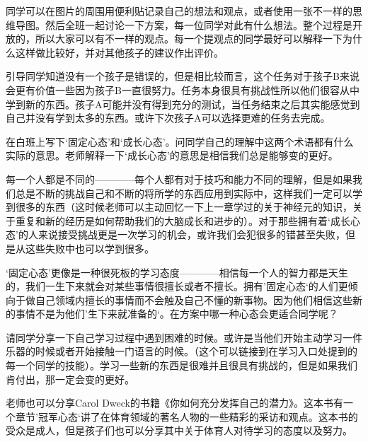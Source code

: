     同学可以在图片的周围用便利贴记录自己的想法和观点，或者使用一张不一样的思维导图。然后全班一起讨论一下方案，每一位同学对此有什么想法。整个过程是开放的，所以大家可以有不一样的观点。每一个提观点的同学最好可以解释一下为什么这样做比较好，并对其他孩子的建议作出评价。\par
    引导同学知道没有一个孩子是错误的，但是相比较而言，这个任务对于孩子B来说会更有价值一些因为孩子B一直很努力。任务本身很具有挑战性所以他们很容从中学到新的东西。孩子A可能并没有得到充分的测试，当任务结束之后其实能感觉到自己并没有学到太多的东西。或许下次孩子A可以选择更难的任务去完成。\par
    在白班上写下‘固定心态’和‘成长心态’。问同学自己的理解中这两个术语都有什么实际的意思。老师解释一下‘成长心态’的意思是相信我们总是能够变的更好。\par
    每一个人都是不同的————每个人都有对于技巧和能力不同的理解，但是如果我们总是不断的挑战自己和不断的将所学的东西应用到实际中，这样我们一定可以学到很多的东西（这时候老师可以主动回忆一下上一章学过的关于神经元的知识，关于重复和新的经历是如何帮助我们的大脑成长和进步的）。对于那些拥有着‘成长心态’的人来说接受挑战更是一次学习的机会，或许我们会犯很多的错甚至失败，但是从这些失败中也可以学到很多。\par
    ‘固定心态'更像是一种很死板的学习态度————相信每一个人的智力都是天生的，我们一生下来就会对某些事情很擅长或者不擅长。拥有’固定心态‘的人们更倾向于做自己领域内擅长的事情而不会触及自己不懂的新事物。因为他们相信这些新的事情不是为他们’生下来就准备的‘。在方案中哪一种心态会更适合同学呢？\par
    请同学分享一下自己学习过程中遇到困难的时候。或许是当他们开始主动学习一件乐器的时候或者开始接触一门语言的时候。（这个可以链接到在学习入口处提到的每一个同学的技能）。学习一些新的东西是很难并且很具有挑战的，但是如果我们肯付出，那一定会变的更好。\par
    老师也可以分享Carol Dweck的书籍《你如何充分发挥自己的潜力》。这本书有一个章节’冠军心态‘讲了在体育领域的著名人物的一些精彩的采访和观点。这本书的受众是成人，但是孩子们也可以分享其中关于体育人对待学习的态度以及努力。\par
    

